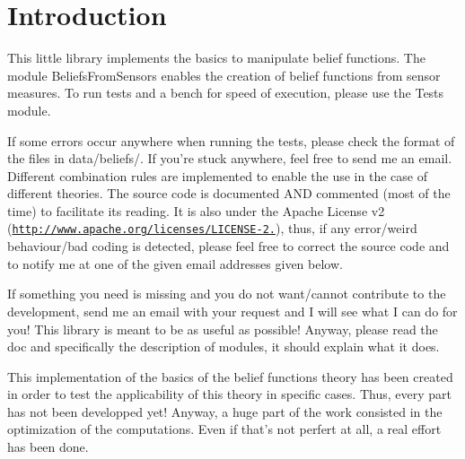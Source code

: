 \hypertarget{index_intro_sec}{}\section{Introduction}\label{index_intro_sec}
This little library implements the basics to manipulate belief functions. The module Beliefs\-From\-Sensors enables the creation of belief functions from sensor measures. To run tests and a bench for speed of execution, please use the Tests module.

If some errors occur anywhere when running the tests, please check the format of the files in data/beliefs/. If you're stuck anywhere, feel free to send me an email. Different combination rules are implemented to enable the use in the case of different theories. The source code is documented A\-N\-D commented (most of the time) to facilitate its reading. It is also under the Apache License v2 (\href{http://www.apache.org/licenses/LICENSE-2.0}{\tt http\-://www.\-apache.\-org/licenses/\-L\-I\-C\-E\-N\-S\-E-\/2.}), thus, if any error/weird behaviour/bad coding is detected, please feel free to correct the source code and to notify me at one of the given email addresses given below. \par


If something you need is missing and you do not want/cannot contribute to the development, send me an email with your request and I will see what I can do for you! This library is meant to be as useful as possible! Anyway, please read the doc and specifically the description of modules, it should explain what it does.

This implementation of the basics of the belief functions theory has been created in order to test the applicability of this theory in specific cases. Thus, every part has not been developped yet! Anyway, a huge part of the work consisted in the optimization of the computations. Even if that's not perfert at all, a real effort has been done.

